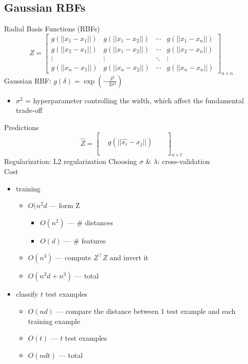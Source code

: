 \documentclass[10pt,landscape,a4paper]{article}
\begin{document}
\begin{multicols*}{5}
\section{Gaussian RBFs}
Radial Basis Functions (RBFs)
\begin{dmath*}
    Z =
    \begin{bmatrix}
        g(||x_1-x_1||) & g(||x_1-x_2||) & \cdots & g(||x_1-x_n||) \\
        g(||x_2-x_1||) & g(||x_1-x_2||) & \cdots & g(||x_2-x_n||) \\
        \vdots & \vdots & \ddots & \vdots \\
        g(||x_n-x_1||) & g(||x_n-x_2||) & \cdots & g(||x_n-x_n||)
    \end{bmatrix}_{n \times n}
\end{dmath*}
Gaussian RBF: \(g(\delta) = \exp(-\frac{\delta^2}{2\sigma^2})\)
\begin{itemize}
    \item \(\sigma^2\) = hyperparameter controlling the width, which affect the fundamental trade-off
\end{itemize}
Predictions
\begin{dmath*}
    \hat{Z} =
    \begin{bmatrix}
        &  &  & \\
    & g(||\hat{x_i}-x_j||) &  &  \\
        &  &  &  \\
    &  &  &
\end{bmatrix}_{n \times t}
\end{dmath*}
Regularization: L2 regularization
Choosing \(\sigma \) \& \(\lambda \): cross-validation \\
Cost
\begin{itemize}
    \item training
    \begin{itemize}
        \item \(O(n^2d\) --- form Z
        \begin{itemize}
            \item \(O(n^2)\) --- \# distances
            \item \(O(d)\) --- \# features
        \end{itemize}
        \item \(O(n^3)\) --- compute \(Z^\intercal Z\) and invert it
        \item \(O(n^2d+n^3)\) --- total
    \end{itemize}
    \item classify \(t\) test examples
    \begin{itemize}
        \item \(O(nd)\) --- compare the distance between 1 test example and each training example
        \item \(O(t)\) --- \(t\) test examples
        \item \(O(ndt)\) --- total
    \end{itemize}
\end{itemize}


\end{multicols*}
\end{document}
